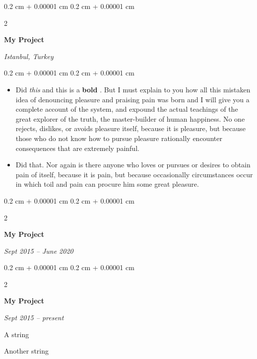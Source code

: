 \documentclass[10pt, letterpaper]{article}
\newenvironment{summary}{
    \begin{description}[
        topsep=0.10 cm,
        parsep=0.10 cm,
        partopsep=0pt,
        itemsep=0pt,
        leftmargin=0.4 cm + 10pt
    ]
}{
    \end{description}
} %
\newenvironment{highlights}{
    \begin{itemize}[
        topsep=0.10 cm,
        parsep=0.10 cm,
        partopsep=0pt,
        itemsep=0pt,
        leftmargin=0.4 cm + 10pt
    ]
}{
    \end{itemize}
} %
\newenvironment{onecolentry}{
    \begin{adjustwidth}{
        0.2 cm + 0.00001 cm
    }{
        0.2 cm + 0.00001 cm
    }
}{
    \end{adjustwidth}
} %
\newenvironment{twocolentry}[2][]{
    \onecolentry
    \def\secondColumn{#2}
    \setcolumnwidth{\fill, 4.5 cm}
    \begin{paracol}{2}
}{
    \switchcolumn \raggedleft \secondColumn
    \end{paracol}
    \endonecolentry
} %
\let\hrefWithoutArrow\href
\renewcommand{\href}[2]{\hrefWithoutArrow{#1}{\ifthenelse{\equal{#2}{}}{ }{#2 }\raisebox{.15ex}{\footnotesize \faExternalLink*}}}
\begin{document}
        \vspace{0.2 cm}

        \begin{twocolentry}{
        \textit{Istanbul, Turkey}    
            
        }
            \textbf{My Project}
        \end{twocolentry}
        \vspace{0.10 cm}
        \begin{onecolentry}
            \begin{highlights}
                \item Did \textit{this} and this is a \textbf{bold} \href{https://example.com}{link}. But I must explain to you how all this mistaken idea of denouncing pleasure and praising pain was born and I will give you a complete account of the system, and expound the actual teachings of the great explorer of the truth, the master-builder of human happiness. No one rejects, dislikes, or avoids pleasure itself, because it is pleasure, but because those who do not know how to pursue pleasure rationally encounter consequences that are extremely painful.
                \item Did that. Nor again is there anyone who loves or pursues or desires to obtain pain of itself, because it is pain, but because occasionally circumstances occur in which toil and pain can procure him some great pleasure.
            \end{highlights}
        \end{onecolentry}


        \vspace{0.2 cm}

        \begin{twocolentry}{
            
            
        \textit{Sept 2015 – June 2020}}
            \textbf{My Project}
        \end{twocolentry}


        \vspace{0.2 cm}

        \begin{twocolentry}{
            
            
        \textit{Sept 2015 – present}}
            \textbf{My Project}
        \end{twocolentry}
            \begin{summary}
                \item A string
                \item Another string
            \end{summary}
\end{document}
